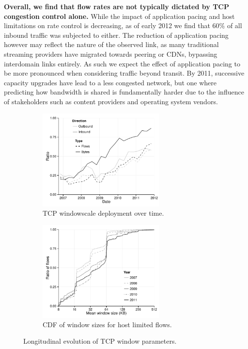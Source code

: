 \textbf{Overall, we find that flow rates are not typically dictated by TCP congestion control alone.}
While the impact of application pacing and host limitations on rate control is decreasing, as of early 2012 we find that 60\% of all inbound traffic was subjected to either. 
The reduction of application pacing however may reflect the nature of the observed link, as many traditional streaming providers have migrated towards peering or CDNs, bypassing interdomain links entirely. As such we expect the effect of application pacing to be more pronounced when considering traffic beyond transit.
By 2011, successive capacity upgrades have lead to a less congested network, but one where predicting how bandwidth is shared is fundamentally harder due to the influence of stakeholders such as content providers and operating system vendors.

\begin{figure}
    \begin{subfigure}[b]{.5\linewidth}
        \centering
        \includegraphics[width=2.5in]{figures/malawi/windowscale}
        \caption{TCP windowscale deployment over time. \label{fig:windowscale}}
    \end{subfigure}%
    \begin{subfigure}[b]{.5\linewidth}
        \centering
        \includegraphics[width=2.5in]{figures/malawi/hostwindow}
        \caption{CDF of window sizes for host limited flows.\label{fig:hostwindow}}
    \end{subfigure}%
    \caption{Longitudinal evolution of TCP window parameters. \label{fig:tcpWindowParams}}
\end{figure}


